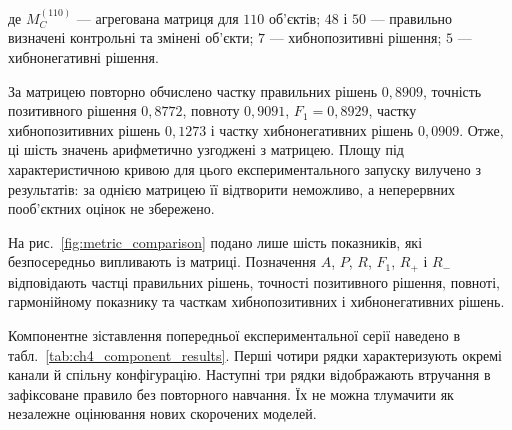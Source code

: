 де $M_C^{(110)}$ --- агрегована матриця для $110$ об’єктів; $48$ і $50$ --- правильно визначені контрольні та змінені об’єкти; $7$ --- хибнопозитивні рішення; $5$ --- хибнонегативні рішення.

За матрицею повторно обчислено частку правильних рішень $0{,}8909$, точність позитивного рішення $0{,}8772$, повноту $0{,}9091$, $F_1=0{,}8929$, частку хибнопозитивних рішень $0{,}1273$ і частку хибнонегативних рішень $0{,}0909$. Отже, ці шість значень арифметично узгоджені з матрицею. Площу під характеристичною кривою для цього експериментального запуску вилучено з результатів: за однією матрицею її відтворити неможливо, а неперервних пооб’єктних оцінок не збережено.

На рис.~\ref{fig:metric_comparison} подано лише шість показників, які безпосередньо випливають із матриці. Позначення $A$, $P$, $R$, $F_1$, $R_{+}$ і $R_{-}$ відповідають частці правильних рішень, точності позитивного рішення, повноті, гармонійному показнику та часткам хибнопозитивних і хибнонегативних рішень.



Компонентне зіставлення попередньої експериментальної серії наведено в табл.~\ref{tab:ch4_component_results}. Перші чотири рядки характеризують окремі канали й спільну конфігурацію. Наступні три рядки відображають втручання в зафіксоване правило без повторного навчання. Їх не можна тлумачити як незалежне оцінювання нових скорочених моделей.

